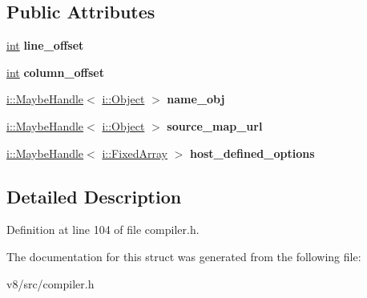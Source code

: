 \subsection*{Public Attributes}
\begin{DoxyCompactItemize}
\item 
\mbox{\label{structv8_1_1internal_1_1Compiler_1_1ScriptDetails_adf1fe06cba880f03a8eda273d1cdd01e}} 
\mbox{\hyperlink{classint}{int}} {\bfseries line\+\_\+offset}
\item 
\mbox{\label{structv8_1_1internal_1_1Compiler_1_1ScriptDetails_a5dbfee1de0b08d794601203bec58f32a}} 
\mbox{\hyperlink{classint}{int}} {\bfseries column\+\_\+offset}
\item 
\mbox{\label{structv8_1_1internal_1_1Compiler_1_1ScriptDetails_a4de69aea16350651c675c47f491fdcad}} 
\mbox{\hyperlink{classv8_1_1internal_1_1MaybeHandle}{i\+::\+Maybe\+Handle}}$<$ \mbox{\hyperlink{classv8_1_1internal_1_1Object}{i\+::\+Object}} $>$ {\bfseries name\+\_\+obj}
\item 
\mbox{\label{structv8_1_1internal_1_1Compiler_1_1ScriptDetails_aee31cb7bfea4be74dacf955480b3af60}} 
\mbox{\hyperlink{classv8_1_1internal_1_1MaybeHandle}{i\+::\+Maybe\+Handle}}$<$ \mbox{\hyperlink{classv8_1_1internal_1_1Object}{i\+::\+Object}} $>$ {\bfseries source\+\_\+map\+\_\+url}
\item 
\mbox{\label{structv8_1_1internal_1_1Compiler_1_1ScriptDetails_a4e69f56d4d343b965ffd864c2e334508}} 
\mbox{\hyperlink{classv8_1_1internal_1_1MaybeHandle}{i\+::\+Maybe\+Handle}}$<$ \mbox{\hyperlink{classv8_1_1internal_1_1FixedArray}{i\+::\+Fixed\+Array}} $>$ {\bfseries host\+\_\+defined\+\_\+options}
\end{DoxyCompactItemize}


\subsection{Detailed Description}


Definition at line 104 of file compiler.\+h.



The documentation for this struct was generated from the following file\+:\begin{DoxyCompactItemize}
\item 
v8/src/compiler.\+h\end{DoxyCompactItemize}
